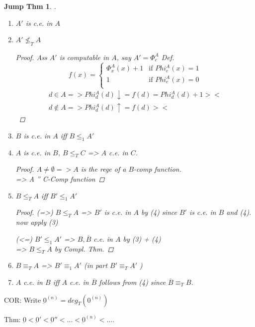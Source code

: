 \documentclass[12pt]{article}
\newcommand{\Conj}[1]{\ensuremath{\overline{#1}}}
\begin{document}
\newtheorem*{jmpthm}{Jump Thm}
\begin{jmpthm}
 .
 \begin{enumerate}[(1)]
  \item $A'$ is c.e. in $A$
  \item $A' \not\le_T A$
\begin{proof}
 Ass $A'$ is computable in $A$, say $A' = \Phi^A_e$
 Def. \[
       f(x) = \begin{cases}
               \Phi^A_x(x)+1	&\text{if } Phi^A_e(x) = 1 \\ %
		1 		&\text{if } Phi^A_e(x) = 0 \\ %
              \end{cases}
       \]
\begin{align*}
 d \in A => Phi^A_d(d) \downarrow = f(d) = Phi^A_d(d) +1 >< \\ %
 d \not\in A => Phi^A_d(d) \uparrow = f(d) >< %
\end{align*}			%
\end{proof}
  \item $B$ is c.e. in $A$ iff $B \le_1 A'$
  \item $A$ is c.e. in $B$, $B \le_T C$ => $A$ c.e. in $C$.
\begin{proof}
 $A \ne \emptyset => A$ is the rege of a $B$-comp function. \\
=> A '' C-Comp function
\end{proof}
  \item $B \le_T A$ iff $B' \le_1 A'$
\begin{proof}
 (=>) $B \le_T A$ => $B'$ is c.e. in $A$ by (4) since $B'$ is c.e. in $B$ and (4).
now apply (3)

 (<=) $B' \le_1 A'$ => $B, \Conj{B}$ c.e. in $A$ by (3) + (4) \\
  => $B \le_T A$ by Compl. Thm.
\end{proof}
  \item $B \equiv_T A$ => $B' \equiv_1 A'$	(in part $B' \equiv_T A'$ )
  \item $A$ c.e. in $B$ iff $A$ c.e. in $\Conj{B}$ 
	\proof follows from (4) since $\Conj{B} \equiv_T B$.


 \end{enumerate}
\end{jmpthm}

COR: Write $\underbar{0}^{(n)} = deg_T( 0^{(n)})$

Thm: $\underbar{0} < \underbar{0}' < \underbar{0}'' < \ldots < \underbar{0}^{(n)} < \ldots$.
\end{document}
